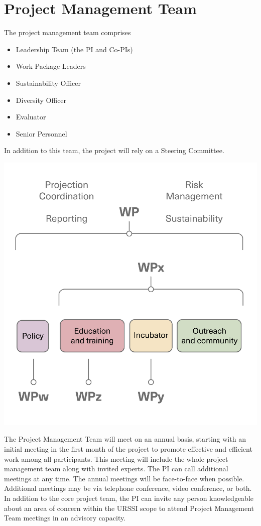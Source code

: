 \documentclass[
]{book}
\providecommand{\tightlist}{%
  \setlength{\itemsep}{0pt}\setlength{\parskip}{0pt}}
\begin{document}
\hypertarget{project-management-team}{%
\section{Project Management Team}\label{project-management-team}}

The project management team comprises

\begin{itemize}
\tightlist
\item
  Leadership Team (the PI and Co-PIs)
\item
  Work Package Leaders
\item
  Sustainability Officer
\item
  Diversity Officer
\item
  Evaluator
\item
  Senior Personnel
\end{itemize}

In addition to this team, the project will rely on a Steering Committee.

\includegraphics{images/managementStructure.png}

The Project Management Team will meet on an annual basis, starting with an initial meeting in the
first month of the project to promote effective and efficient work among all participants. This
meeting will include the whole project management team along with invited experts. The PI can call
additional meetings at any time. The annual meetings will be face-to-face when possible. Additional
meetings may be via telephone conference, video conference, or both. In addition to the core project
team, the PI can invite any person knowledgeable about an area of concern within the URSSI scope to
attend Project Management Team meetings in an advisory capacity.
\end{document}
